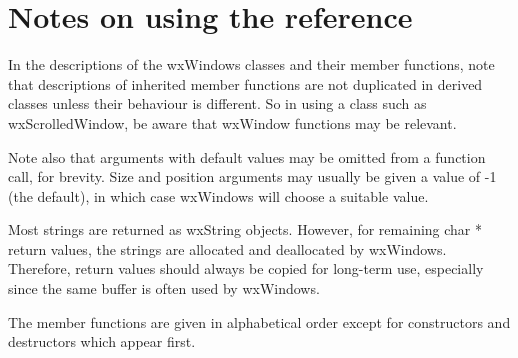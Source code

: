 \section{Notes on using the reference}\label{referencenotes}

In the descriptions of the wxWindows classes and their member
functions, note that descriptions of inherited member functions are not
duplicated in derived classes unless their behaviour is different. So in
using a class such as wxScrolledWindow, be aware that wxWindow functions may be
relevant.

Note also that arguments with default values may be omitted from a
function call, for brevity. Size and position arguments may usually be
given a value of -1 (the default), in which case wxWindows will choose a
suitable value.

Most strings are returned as wxString objects. However, for remaining
char * return values, the strings are allocated and
deallocated by wxWindows. Therefore, return values should always be
copied for long-term use, especially since the same buffer is often
used by wxWindows.

The member functions are given in alphabetical order except for
constructors and destructors which appear first.

